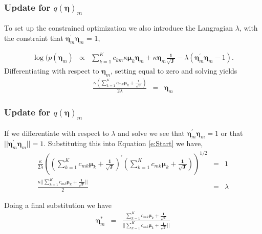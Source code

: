 \documentclass{beamer}
\numberwithin{equation}{section}
\begin{document}
\begin{frame}
\frametitle{Update for $q(\boldsymbol{\eta})_{m}$ }

To set up the constrained optimization we also introduce the Langragian $\lambda$, with the constraint that $\boldsymbol{\eta}_{m}^{'} \boldsymbol{\eta}_{m}$  = 1,




\begin{eqnarray}
\log(p(\boldsymbol{\eta}_{m} ) &  \propto & \sum_{k=1}^{K} c_{km} \kappa \boldsymbol{\mu}_{k} \boldsymbol{\eta}_{m} + \kappa \boldsymbol{\eta}_{m}\boldsymbol{\frac{1}{\sqrt{J}}}  - \lambda(\boldsymbol{\eta}_{m}^{'} \boldsymbol{\eta}_{m} - 1). \nonumber
\end{eqnarray}
Differentiating with respect to $\boldsymbol{\eta}_{m}$, setting equal to zero and solving yields
\begin{eqnarray}
\frac{\kappa \left(\sum_{k=1}^{K} c_{mk} \boldsymbol{\mu}_{k}  + \boldsymbol{\frac{1}{\sqrt{J}}} \right) }{2 \lambda } & = & \boldsymbol{\eta}_{m} \label{e:Start}
\end{eqnarray}
\end{frame}


\begin{frame}
\frametitle{Update for $q(\boldsymbol{\eta})_{m}$ }
If we differentiate with respect to $\lambda$ and solve we see that $\boldsymbol{\eta}_{m}^{'} \boldsymbol{\eta}_{m} = 1$ or that $||\boldsymbol{\eta}_{m}^{'} \boldsymbol{\eta}_{m}|| =1$.  Substituting this into Equation \ref{e:Start} we have,
\begin{eqnarray}
\frac{\kappa}{2 \lambda} \left( \left(\sum_{k=1}^{K} c_{mk} \boldsymbol{\mu}_{k}  + \boldsymbol{\frac{1}{\sqrt{J}}} \right)^{'} \left(\sum_{k=1}^{K} c_{mk} \boldsymbol{\mu}_{k}  + \boldsymbol{\frac{1}{\sqrt{J}}} \right) \right)^{1/2}  & = & 1 \nonumber \\
\frac{\kappa ||\sum_{k=1}^{K} c_{mk} \boldsymbol{\mu}_{k}  + \boldsymbol{\frac{1}{\sqrt{J}}} || }{2} & = & \lambda \nonumber
\end{eqnarray}

Doing a final substitution we have
\begin{eqnarray}
\boldsymbol{\eta}^{*}_{m} & = & \frac{\sum_{k=1}^{K} c_{mk} \boldsymbol{\mu}_{k}  + \boldsymbol{\frac{1}{\sqrt{J}}}}{||\sum_{k=1}^{K} c_{mk} \boldsymbol{\mu}_{k}  + \boldsymbol{\frac{1}{\sqrt{J}}}||} \nonumber
\end{eqnarray}


\end{frame}
\end{document}

